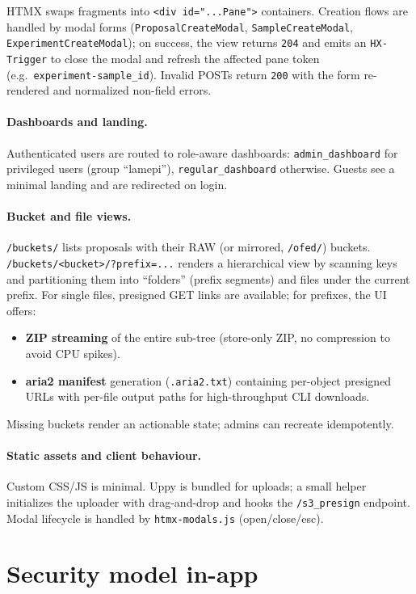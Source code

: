 HTMX swaps fragments into \texttt{<div id="...Pane">} containers. Creation flows are handled by modal forms (\texttt{ProposalCreateModal}, \texttt{SampleCreateModal}, \texttt{ExperimentCreateModal}); on success, the view returns \texttt{204} and emits an \texttt{HX-Trigger} to close the modal and refresh the affected pane token (e.g.\ \texttt{experiment-{sample\_id}}). Invalid POSTs return \texttt{200} with the form re-rendered and normalized non-field errors.

\paragraph{Dashboards and landing.}
Authenticated users are routed to role-aware dashboards: \texttt{admin\_dashboard} for privileged users (group “lamepi”), \texttt{regular\_dashboard} otherwise. Guests see a minimal landing and are redirected on login.

\paragraph{Bucket and file views.}
\texttt{/buckets/} lists proposals with their RAW (or mirrored, \texttt{/ofed/}) buckets. \texttt{/buckets/<bucket>/?prefix=...} renders a hierarchical view by scanning keys and partitioning them into “folders” (prefix segments) and files under the current prefix. For single files, presigned GET links are available; for prefixes, the UI offers:
\begin{itemize}
	\item \textbf{ZIP streaming} of the entire sub-tree (store-only ZIP, no compression to avoid CPU spikes).
	\item \textbf{aria2 manifest} generation (\texttt{.aria2.txt}) containing per-object presigned URLs with per-file output paths for high-throughput CLI downloads.
\end{itemize}
Missing buckets render an actionable state; admins can recreate idempotently.

\paragraph{Static assets and client behaviour.}
Custom CSS/JS is minimal. Uppy is bundled for uploads; a small helper initializes the uploader with drag-and-drop and hooks the \texttt{/s3\_presign} endpoint. Modal lifecycle is handled by \texttt{htmx-modals.js} (open/close/esc).

\section{Security model in-app}\label{sec:security}

